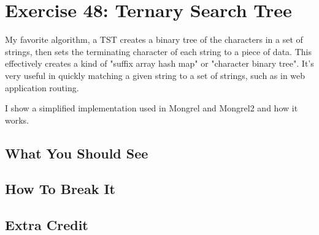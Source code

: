 \chapter{Exercise 48: Ternary Search Tree}

My favorite algorithm, a TST creates a binary tree of the characters in a set
of strings, then sets the terminating character of each string to a piece of
data.  This effectively creates a kind of "suffix array hash map" or "character
binary tree".  It's very useful in quickly matching a given string to a set of
strings, such as in web application routing.

I show a simplified implementation used in Mongrel and Mongrel2 and how it works.


\section{What You Should See}


\section{How To Break It}


\section{Extra Credit}



